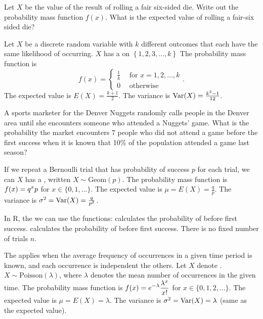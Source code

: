 \begin{tcolorbox}
\bb[resume]
\ii Let $X$ be the value of the result of rolling a fair six-sided die.
\bb
\ii Write out the probability mass function $f(x)$. \vfill
\ii What is the expected value of rolling a fair-six sided die? \vfill
\ee
\ee


\bbox
Let $X$ be a discrete random variable with $k$ different outcomes that each have the same likelihood of occurring.
\bi
\ii $X$ has a \textbf{} on $\left\{ 1, 2, 3, \ldots , k \right\}$
\ii The probability mass function is 
\[ f(x) = \left\{ \begin{array}{ll} \frac{1}{k} \ \ & \mbox{for } x = 1, 2, \ldots,  k\\
0 \ \ & \mbox{otherwise} \end{array} \right. .\]
\ii The expected value is $E(X) = \frac{k+1}{2}$.
\ii The variance is $\mbox{Var}(X) = \frac{k^2-1}{12}$.
\ei 
\ebox

\bb[resume]
\ii A sports marketer for the Denver Nuggets randomly calls people in the Denver area until she encounters someone who attended a Nuggets' game. What is the probability the market encounters $7$ people who did not attend a game before the first success when it is known that 10\% of the population attended a game last season? \vfill
\ee

\clearpage



\bbox
If we repeat a Bernoulli trial that has probability of success $p$ for each trial, we can 
\bi
\ii $X$ has a \textbf{}, written $X \sim \mbox{Geom}(p)$.
\ii The probability mass function is $\displaystyle f(x) = q^xp$ for $x \in \lbrace 0, 1, \ldots \rbrace$.
\ii The expected value is $\mu=E(X) = \frac{q}{p}$.
\ii The variance is $\sigma^2 = \mbox{Var}(X) = \frac{q}{p^2}$.
\ei

\medskip

In R, the we can use the functions:
\bi
\ii {} calculates the probability of  before first success. 
\ii {} calculates the probability of  before first success.
\ii There is no fixed number of trials $n$.
\ei 
\ebox


\bbox
The \textbf{} applies when the average frequency of occurrences in a given time period is known, and each occurrence is independent the others. Let $X$ denote .
\bi
\ii $X \sim \mbox{Poisson}(\lambda)$, where $\lambda$ denotes the mean number of occurrences in the given time.
\ii The probability mass function is $\displaystyle f(x) = e^{-\lambda} \frac{\lambda^x}{x!}$ for $x \in \lbrace 0, 1, 2, \ldots \rbrace$.
\ii The expected value is $\mu = E(X) = \lambda$.
\ii The variance is $\sigma^2 = \mbox{Var}(X) = \lambda$ (same as the expected value).
\ei 


\end{tcolorbox}

